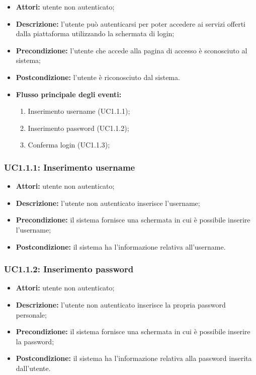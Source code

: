 \begin{itemize}
    \item \textbf{Attori:}
    	utente non autenticato;
    \item \textbf{Descrizione:}
    	l'utente può autenticarsi per poter accedere ai servizi offerti dalla piattaforma utilizzando la schermata di login;
    \item \textbf{Precondizione:}
        l'utente che accede alla pagina di accesso è sconosciuto al sistema;
    \item \textbf{Postcondizione:}
    	l'utente è riconosciuto dal sistema.
    \item \textbf{Flusso principale degli eventi:}

    \begin{enumerate}
        \item Inserimento username (UC1.1.1);
        \item Inserimento password (UC1.1.2);
        \item Conferma login (UC1.1.3);
    \end{enumerate}

\end{itemize}

\subsubsection{UC1.1.1: Inserimento username}

\begin{itemize}
    \item \textbf{Attori:} utente non autenticato;
    \item \textbf{Descrizione:} l'utente non autenticato inserisce l'username;
    \item \textbf{Precondizione:} il sistema fornisce una schermata in cui è possibile inserire l’username;
    \item \textbf{Postcondizione:} il sistema ha l'informazione relativa all'username.
\end{itemize}

\subsubsection{UC1.1.2: Inserimento password}

\begin{itemize}
    \item \textbf{Attori:} utente non autenticato;
    \item \textbf{Descrizione:} l'utente non autenticato inserisce la propria password personale;
    \item \textbf{Precondizione:} il sistema fornisce una schermata in cui è possibile inserire la password;
    \item \textbf{Postcondizione:} il sistema ha l'informazione relativa alla password inserita dall'utente.
\end{itemize}

